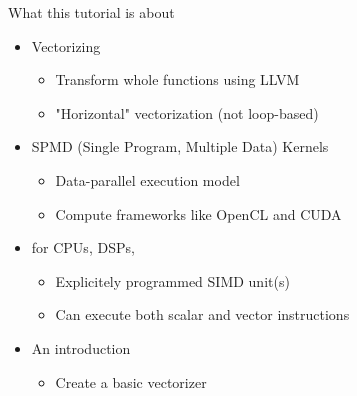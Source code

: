 \documentclass[t,aspectratio=169]{beamer}
\begin{document}
\begin{frame}{What this tutorial is about}

\begin{minipage}[t]{0.70\linewidth}

\begin{itemize}  
    \item Vectorizing
    \begin{itemize}
        \item Transform whole functions using LLVM
        \item "Horizontal" vectorization (not loop-based)
    \end{itemize}  
    \item SPMD (Single Program, Multiple Data) Kernels
    \begin{itemize}
        \item Data-parallel execution model
        \item Compute frameworks like OpenCL and CUDA
    \end{itemize}
    \item for CPUs, DSPs,
    \begin{itemize}
        \item Explicitely programmed SIMD unit(s)
        \item Can execute both scalar and vector instructions
    \end{itemize}
    \item An introduction
    \begin{itemize}
        \item Create a basic vectorizer
    \end{itemize}
\end{itemize}


\end{minipage}
\end{frame}
\end{document}
